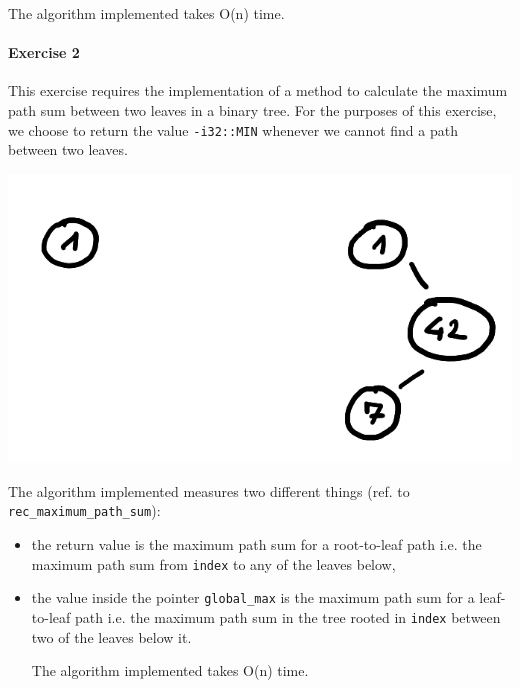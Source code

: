 \documentclass[12pt]{report}
\theoremstyle{definition}
\theoremstyle{definition}
\begin{document}
The algorithm implemented takes O(n) time.
\paragraph*{Exercise 2}
This exercise requires the implementation of a method to calculate the maximum path sum
between two leaves in a binary tree. For the purposes of this exercise, we choose to return
the value \texttt{-i32::MIN} whenever we cannot find a path between two leaves.

\includegraphics[scale=0.4]{images/ex2-trees-no-mps.png}

\pagebreak
The algorithm implemented measures two different things
(ref. to \linebreak \texttt{rec\_maximum\_path\_sum}):
\begin{itemize}
\item the return value is the maximum path sum for a root-to-leaf path i.e. the maximum
path sum from \texttt{index} to any of the leaves below,
\item the value inside the pointer \texttt{global\_max} is the maximum path sum for a
leaf-to-leaf path i.e. the maximum path sum in the tree rooted in \texttt{index}
between two of the leaves below it.


The algorithm implemented takes O(n) time.
\end{itemize}
\end{document}
